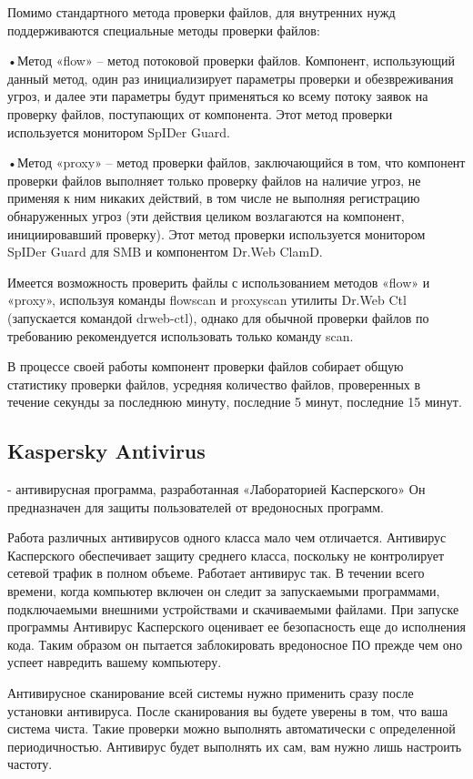 \documentclass[a4paper,14pt]{extarticle}
\begin{document}
Помимо стандартного метода проверки файлов, для внутренних нужд поддерживаются специальные методы проверки файлов:

•Метод «flow» – метод потоковой проверки файлов. Компонент, использующий данный метод, один раз инициализирует параметры проверки и обезвреживания угроз, и далее эти параметры будут применяться ко всему потоку заявок на проверку файлов, поступающих от компонента. Этот метод проверки используется монитором SpIDer Guard.

•Метод «proxy» – метод проверки файлов, заключающийся в том, что компонент проверки файлов выполняет только проверку файлов на наличие угроз, не применяя к ним никаких действий, в том числе не выполняя регистрацию обнаруженных угроз (эти действия целиком возлагаются на компонент, инициировавший проверку). Этот метод проверки используется монитором SpIDer Guard для SMB и компонентом Dr.Web ClamD.

Имеется возможность проверить файлы с использованием методов «flow» и «proxy», используя команды flowscan и proxyscan утилиты Dr.Web Ctl (запускается командой drweb-ctl), однако для обычной проверки файлов по требованию рекомендуется использовать только команду scan.

В процессе своей работы компонент проверки файлов собирает общую статистику проверки файлов, усредняя количество файлов, проверенных в течение секунды за последнюю минуту, последние 5 минут, последние 15 минут.\cite{drweb}


\subsection{Kaspersky Antivirus}
- антивирусная программа, разработанная «Лабораторией Касперского» Он предназначен для защиты пользователей от вредоносных программ.

Работа различных антивирусов одного класса мало чем отличается. Антивирус Касперского обеспечивает защиту среднего класса, поскольку не контролирует сетевой трафик в полном объеме. Работает антивирус так. В течении всего времени, когда компьютер включен он следит за запускаемыми программами, подключаемыми внешними устройствами и скачиваемыми файлами. При запуске программы Антивирус Касперского оценивает ее безопасность еще до исполнения кода. Таким образом он пытается заблокировать вредоносное ПО прежде чем оно успеет навредить вашему компьютеру. 

Антивирусное сканирование всей системы нужно применить сразу после установки антивируса. После сканирования вы будете уверены в том, что ваша система чиста. Такие проверки можно выполнять автоматически с определенной периодичностью. Антивирус будет выполнять их сам, вам нужно лишь настроить частоту.
\end{document}
